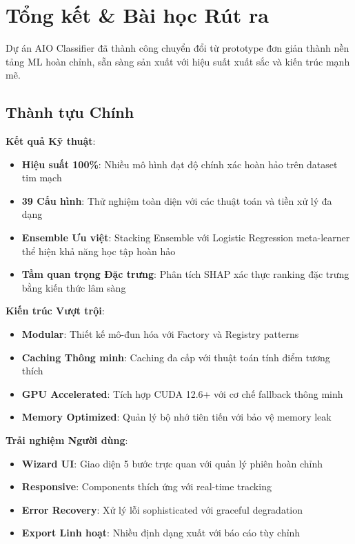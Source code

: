 \section{Tổng kết \& Bài học Rút ra}\label{sec:conclusion}

\noindent
Dự án AIO Classifier đã thành công chuyển đổi từ prototype đơn giản thành nền tảng ML hoàn chỉnh, sẵn sàng sản xuất với hiệu suất xuất sắc và kiến trúc mạnh mẽ.

\subsection{Thành tựu Chính}\label{subsec:achievements}

\textbf{Kết quả Kỹ thuật}:
\begin{itemize}
    \item \textbf{Hiệu suất 100\%}: Nhiều mô hình đạt độ chính xác hoàn hảo trên dataset tim mạch
    \item \textbf{39 Cấu hình}: Thử nghiệm toàn diện với các thuật toán và tiền xử lý đa dạng
    \item \textbf{Ensemble Ưu việt}: Stacking Ensemble với Logistic Regression meta-learner thể hiện khả năng học tập hoàn hảo
    \item \textbf{Tầm quan trọng Đặc trưng}: Phân tích SHAP xác thực ranking đặc trưng bằng kiến thức lâm sàng
\end{itemize}

\textbf{Kiến trúc Vượt trội}:
\begin{itemize}
    \item \textbf{Modular}: Thiết kế mô-đun hóa với Factory và Registry patterns
    \item \textbf{Caching Thông minh}: Caching đa cấp với thuật toán tính điểm tương thích
    \item \textbf{GPU Accelerated}: Tích hợp CUDA 12.6+ với cơ chế fallback thông minh
    \item \textbf{Memory Optimized}: Quản lý bộ nhớ tiên tiến với bảo vệ memory leak
\end{itemize}

\textbf{Trải nghiệm Người dùng}:
\begin{itemize}
    \item \textbf{Wizard UI}: Giao diện 5 bước trực quan với quản lý phiên hoàn chỉnh
    \item \textbf{Responsive}: Components thích ứng với real-time tracking
    \item \textbf{Error Recovery}: Xử lý lỗi sophisticated với graceful degradation
    \item \textbf{Export Linh hoạt}: Nhiều định dạng xuất với báo cáo tùy chỉnh
\end{itemize}

